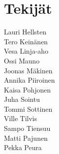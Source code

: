 \chapter{Tekijät}

Lauri Hellsten\\
Tero Keinänen\\
Vesa Linja-aho\\
Ossi Mauno\\
Joonas Mäkinen\\
Annika Piiroinen\\
Kaisa Pohjonen\\
Juha Sointu\\
Tommi Sottinen\\
Ville Tilvis\\
Sampo Tiensuu\\
Matti Pajunen\\
Pekka Peura\\
